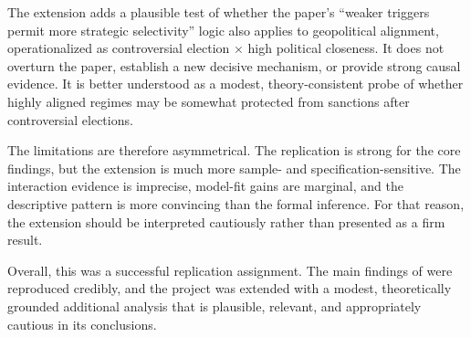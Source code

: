 \documentclass[12pt,letterpaper]{article}
\begin{document}
	The extension adds a plausible test of whether the paper's ``weaker triggers permit more strategic selectivity'' logic also applies to geopolitical alignment, operationalized as controversial election $\times$ high political closeness. It does not overturn the paper, establish a new decisive mechanism, or provide strong causal evidence. It is better understood as a modest, theory-consistent probe of whether highly aligned regimes may be somewhat protected from sanctions after controversial elections.
	
	The limitations are therefore asymmetrical. The replication is strong for the core findings, but the extension is much more sample- and specification-sensitive. The interaction evidence is imprecise, model-fit gains are marginal, and the descriptive pattern is more convincing than the formal inference. For that reason, the extension should be interpreted cautiously rather than presented as a firm result.
	
	Overall, this was a successful replication assignment. The main findings of \citet{vonsoestNotAllDictators2015} were reproduced credibly, and the project was extended with a modest, theoretically grounded additional analysis that is plausible, relevant, and appropriately cautious in its conclusions.


 
 
	
\end{document}
